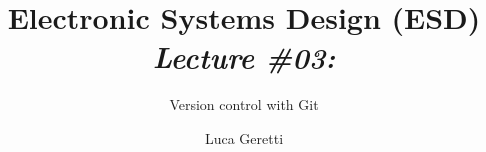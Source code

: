 \documentclass{beamer}
\title[ESD \#03]{Electronic Systems Design (ESD) \\ {\em \small Lecture \#03:}}
\subtitle{Version control with Git}
\author{Luca Geretti}
\date{}
\institute{\uppercase{Università degli Studi di Udine}\\\url{luca.geretti@uniud.it}\\\url{https://bitbucket.org/uniud_esd/course}}
\begin{document}
\begin{frame}[plain,t]
\titlepage
\end{frame}


\end{document}
